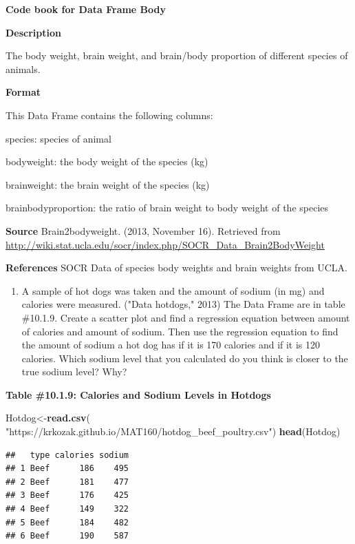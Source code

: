 \documentclass[
]{book}
\newenvironment{Shaded}{\begin{snugshade}}{\end{snugshade}}
\newcommand{\KeywordTok}[1]{\textcolor[rgb]{0.13,0.29,0.53}{\textbf{#1}}}
\newcommand{\NormalTok}[1]{#1}
\newcommand{\StringTok}[1]{\textcolor[rgb]{0.31,0.60,0.02}{#1}}
\providecommand{\tightlist}{%
  \setlength{\itemsep}{0pt}\setlength{\parskip}{0pt}}
\begin{document}
\textbf{Code book for Data Frame Body}

\textbf{Description}

The body weight, brain weight, and brain/body proportion of different species of animals.

\textbf{Format}

This Data Frame contains the following columns:

species: species of animal

bodyweight: the body weight of the species (kg)

brainweight: the brain weight of the species (kg)

brainbodyproportion: the ratio of brain weight to body weight of the species

\textbf{Source}
Brain2bodyweight. (2013, November 16). Retrieved from
\url{http://wiki.stat.ucla.edu/socr/index.php/SOCR_Data_Brain2BodyWeight}

\textbf{References}
SOCR Data of species body weights and brain weights from UCLA.

\begin{enumerate}
\def\labelenumi{\arabic{enumi}.}
\setcounter{enumi}{6}
\tightlist
\item
  A sample of hot dogs was taken and the amount of sodium (in mg) and calories were measured. ("Data hotdogs," 2013) The Data Frame are in table \#10.1.9. Create a scatter plot and find a regression equation between amount of calories and amount of sodium. Then use the regression equation to find the amount of sodium a hot dog has if it is 170 calories and if it is 120 calories. Which sodium level that you calculated do you think is closer to the true sodium level? Why?
\end{enumerate}

\textbf{Table \#10.1.9: Calories and Sodium Levels in Hotdogs}

\begin{Shaded}
\begin{Highlighting}[]
\NormalTok{Hotdog<-}\KeywordTok{read.csv}\NormalTok{(}
  \StringTok{"https://krkozak.github.io/MAT160/hotdog_beef_poultry.csv"}\NormalTok{)}
\KeywordTok{head}\NormalTok{(Hotdog)}
\end{Highlighting}
\end{Shaded}

\begin{verbatim}
##   type calories sodium
## 1 Beef      186    495
## 2 Beef      181    477
## 3 Beef      176    425
## 4 Beef      149    322
## 5 Beef      184    482
## 6 Beef      190    587
\end{verbatim}
\end{document}
